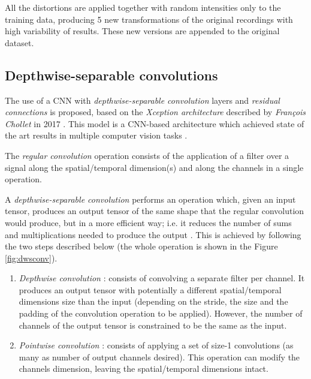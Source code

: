 All the distortions are applied together with random intensities only to the training data, producing 5 new transformations of the original recordings with high variability of results. These new versions are appended to the original dataset.


\subsection{Depthwise-separable convolutions} \label{sec:kwsdwscost}
The use of a CNN with \textit{depthwise-separable convolution} layers and \textit{residual connections} is proposed, based on the \textit{Xception architecture}  described by \textit{François Chollet} in 2017 \autocite{chollet2017}. This model is a CNN-based architecture which achieved state of the art results in multiple computer vision tasks \autocite{liu2019a, Nazar2018, Song2018}.

The \textit{regular convolution} operation consists of the application of a filter over a signal along the spatial/temporal dimension(s) and along the channels in a single operation.

A \textit{depthwise-separable convolution} performs an operation which, given an input tensor, produces an output tensor of the same shape that the regular convolution would produce, but in a more efficient way; i.e. it reduces the number of sums and multiplications needed to produce the output \autocite{chollet2017}. This is achieved by following the two steps described below (the whole operation is shown in the Figure \ref{fig:dwsconv}).



\begin{enumerate}
	\item \textit{Depthwise convolution} \autocite{Yunhui2019}: consists of convolving a separate filter per channel. It produces an output tensor with potentially a different spatial/temporal dimensions size than the input (depending on the stride, the size and the padding of the convolution operation to be applied). However, the number of channels of the output tensor is constrained to be the same as the input.
	\item \textit{Pointwise convolution} \autocite{Gao2018}: consists of applying a set of size-1 convolutions (as many as number of output channels desired). This operation can modify the channels dimension, leaving the spatial/temporal dimensions intact.
\end{enumerate}


